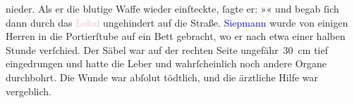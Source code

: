                nieder. Als er die blutige Waffe wieder einſteckte, ſagte er: »« und begab ſich dann durch das \textcolor{pink}{Lokal}{} ungehindert auf die
               Straße. \textcolor{blue}{Siepmann}{}\ledrightnote{\textcolor{blue}{Theodor Siepmann}} wurde von einigen Herren in
               die Portierſtube auf ein Bett gebracht, wo er nach etwa einer halben Stunde
               verſchied. Der Säbel war auf der rechten Seite ungefähr 30 cm tief eingedrungen und
               hatte die Leber und wahrſcheinlich noch andere Organe durchbohrt. Die Wunde war
               abſolut tödtlich, und die ärztliche Hilfe war vergeblich.\pend
           \endnumbering{}  
      